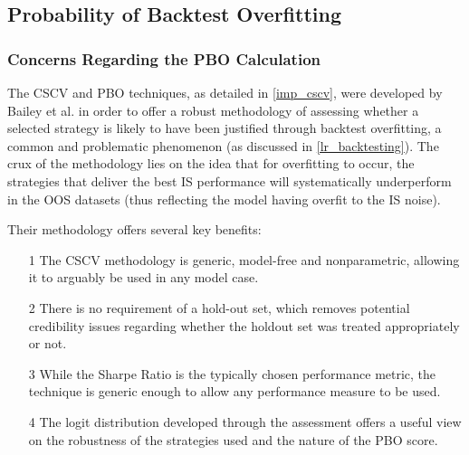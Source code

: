 \documentclass[a4paper,11pt,oneside]{article}
\theoremstyle{plain}
\theoremstyle{definition}
\begin{document}
	\newpage

	\subsection{Probability of Backtest Overfitting}\label{results_pbo}
	
	
	\subsubsection{Concerns Regarding the PBO Calculation}\label{results_pboconcerns}
	
	The CSCV and PBO techniques, as detailed in \ref{imp_cscv}, were developed by Bailey et al. \cite{BailyPBO} in order to offer a robust methodology of assessing whether a selected strategy is likely to have been justified through backtest overfitting, a common and problematic phenomenon (as discussed in \ref{lr_backtesting}). The crux of the methodology lies on the idea that for overfitting to occur, the strategies that deliver the best IS performance will systematically underperform in the OOS datasets (thus reflecting the model having overfit to the IS noise).\newline
	
	Their methodology offers several key benefits:
	\begin{itemize}
		\item[1] The CSCV methodology is generic, model-free and nonparametric, allowing it to arguably be used in any model case.
		\item[2] There is no requirement of a hold-out set, which removes potential credibility issues regarding whether the holdout set was treated appropriately or not.
		\item[3] While the Sharpe Ratio is the typically chosen performance metric, the technique is generic enough to allow any performance measure to be used.
		\item[4] The logit distribution developed through the assessment offers a useful view on the robustness of the strategies used and the nature of the PBO score.
	\end{itemize}
	
\end{document}
